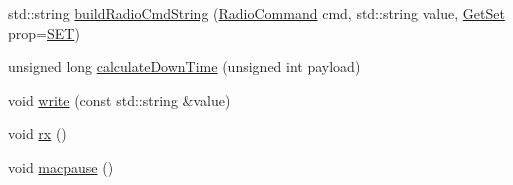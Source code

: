 \begin{DoxyCompactItemize}
\item 
std\+::string \hyperlink{classo_cpt_1_1_lo_ra_a9fadd1ae0e020c59c5a0048f8a2878c7}{build\+Radio\+Cmd\+String} (\hyperlink{classo_cpt_1_1_lo_ra_ae987280d2d608bf474dc3f490790bc74}{Radio\+Command} cmd, std\+::string value, \hyperlink{classo_cpt_1_1_lo_ra_ab2678032cac766b630fb06002f0db91a}{Get\+Set} prop=\hyperlink{classo_cpt_1_1_lo_ra_ab2678032cac766b630fb06002f0db91aa6f1ce6bf9072aeeb8a1296caa25ea324}{S\+ET})
\item 
unsigned long \hyperlink{classo_cpt_1_1_lo_ra_a36aa990d9ce4981d60ef637cc26d0926}{calculate\+Down\+Time} (unsigned int payload)
\item 
void \hyperlink{classo_cpt_1_1_lo_ra_aa96080e6911f8355be8c59da33bfa9d1}{write} (const std\+::string \&value)
\item 
void \hyperlink{classo_cpt_1_1_lo_ra_aa9051cc9d611edc2b5e1f36124d4e972}{rx} ()
\item 
void \hyperlink{classo_cpt_1_1_lo_ra_ac1042fa7b446ce798317a529b6425a4f}{macpause} ()
\end{DoxyCompactItemize}
